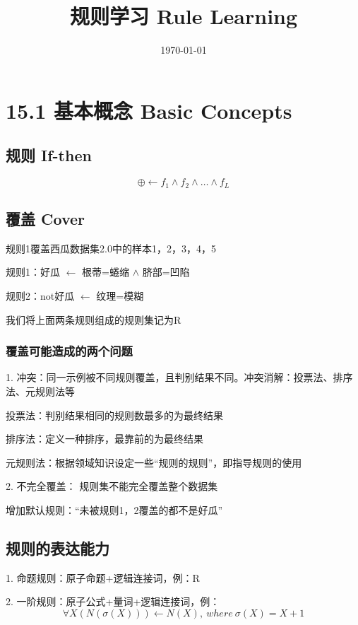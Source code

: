 \documentclass[UTF8]{article}
\title{规则学习 Rule Learning}
\author{}
\date{\today}
\begin{document}
\maketitle
\section{15.1 基本概念 Basic Concepts}
\subsection{规则 If-then}
    \begin{equation}
        \oplus \leftarrow f_1 \wedge f_2 \wedge \dots \wedge f_L
    \end{equation}
\subsection{覆盖 Cover}
    规则1覆盖西瓜数据集2.0中的样本1，2，3，4，5

    规则1：好瓜 $\leftarrow$ 根蒂=蜷缩 $\wedge$ 脐部=凹陷
    
    规则2：not好瓜 $\leftarrow$ 纹理=模糊

    我们将上面两条规则组成的规则集记为R
\subsubsection{覆盖可能造成的两个问题}
    1. 冲突：同一示例被不同规则覆盖，且判别结果不同。冲突消解：投票法、排序法、元规则法等  
        
    投票法：判别结果相同的规则数最多的为最终结果

    排序法：定义一种排序，最靠前的为最终结果

    元规则法：根据领域知识设定一些“规则的规则”，即指导规则的使用
        
    2. 不完全覆盖： 规则集不能完全覆盖整个数据集

    增加默认规则：“未被规则1，2覆盖的都不是好瓜”

\subsection{规则的表达能力}
    1. 命题规则：原子命题+逻辑连接词，例：R

    2. 一阶规则：原子公式+量词+逻辑连接词，例：
    \begin{equation}
        \forall X(N(\sigma (X)))\leftarrow N(X), ~where~ \sigma (X)=X+1
    \end{equation}
    
\end{document}
